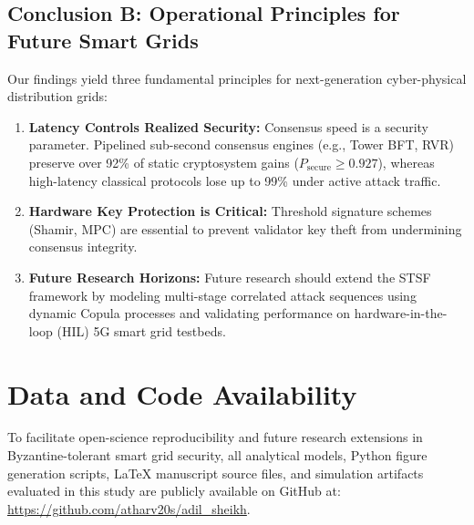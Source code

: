 \documentclass[10pt,twocolumn,journal]{IEEEtran}
\begin{document}
\subsection{Conclusion B: Operational Principles for Future Smart Grids}
Our findings yield three fundamental principles for next-generation cyber-physical distribution grids:
\begin{enumerate}[leftmargin=*]
    \item \textbf{Latency Controls Realized Security:} Consensus speed is a security parameter. Pipelined sub-second consensus engines (e.g., Tower BFT, RVR) preserve over 92\% of static cryptosystem gains ($P_{\text{secure}} \ge 0.927$), whereas high-latency classical protocols lose up to 99\% under active attack traffic.
    \item \textbf{Hardware Key Protection is Critical:} Threshold signature schemes (Shamir, MPC) are essential to prevent validator key theft from undermining consensus integrity.
    \item \textbf{Future Research Horizons:} Future research should extend the STSF framework by modeling multi-stage correlated attack sequences using dynamic Copula processes and validating performance on hardware-in-the-loop (HIL) 5G smart grid testbeds.
\end{enumerate}


\section*{Data and Code Availability}
To facilitate open-science reproducibility and future research extensions in Byzantine-tolerant smart grid security, all analytical models, Python figure generation scripts, LaTeX manuscript source files, and simulation artifacts evaluated in this study are publicly available on GitHub at: \url{https://github.com/atharv20s/adil_sheikh}.
\end{document}
